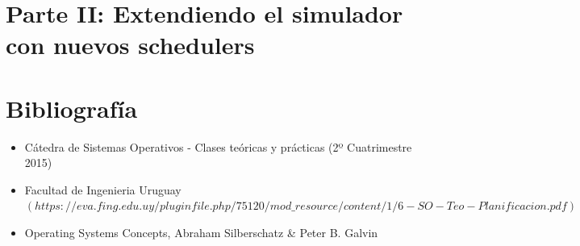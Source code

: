 \documentclass[a4paper,10pt,twoside]{article}
\begin{document}
\section{Parte II: Extendiendo el simulador con nuevos schedulers}


\newpage




\newpage
\section{Bibliografía}

\begin{itemize}
 \item Cátedra de Sistemas Operativos - Clases teóricas y prácticas (2º Cuatrimestre 2015)
 \item Facultad de Ingenieria Uruguay \\
 $(https://eva.fing.edu.uy/pluginfile.php/75120/mod\_resource/content/1/6-SO-Teo-Planificacion.pdf)$
 \item Operating Systems Concepts, Abraham Silberschatz \& Peter B. Galvin
\end{itemize}
\end{document}
